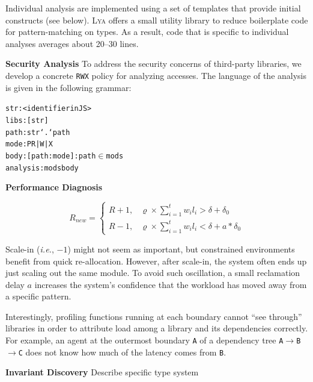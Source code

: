 \documentclass[letterpaper,twocolumn,10pt]{article}
\def\ie{{\em i.e.}, }
\newcommand{\heading}[1]{\vspace{2pt}\noindent\textbf{#1}\enspace}
\newcommand{\ttt}[1]{\texttt{#1}}
\newcommand{\sys}{{\scshape Lya}\xspace}
\begin{document}
Individual analysis are implemented using a set of templates that provide initial constructs (see below).
\sys offers a small utility library to reduce boilerplate code for pattern-matching on types.
As a result, code that is specific to individual analyses averages about 20--30 lines.

\heading{Security Analysis}
To address the security concerns of third-party libraries, we develop a concrete \ttt{RWX} policy for analyzing accesses.
The language of the analysis is given in the following grammar:

\begin{alltt}
  str:  <identifier in JS>
  libs: [ str ]
  path: str `.` path
  mode: P{ R | W | X }
  body: { [ path: mode ]: path \(\in\) mods}
  analysis:  mods body
\end{alltt}

\heading{Performance Diagnosis}

\begin{equation}
\label{eq:2}
R_{new} =
\begin{cases}
  R +1, & \varrho\times\sum_{i=1}^t{w_il_i} > \delta + \delta_0  \\
  R -1,  & \varrho\times\sum_{i=1}^t{w_il_i}  < \delta + a * \delta_0
\end{cases}
\end{equation}

Scale-in (\ie $-1$) might not seem as important, but constrained environments benefit from quick re-allocation.
However, after scale-in, the system often ends up just scaling out the same module.
To avoid such oscillation, a small reclamation delay $a$ increases the system's confidence that the workload has moved away from a specific pattern.

Interestingly, profiling functions running at each boundary cannot ``see through'' libraries in order to attribute load among a library and its dependencies correctly.
For example, an agent at the outermost boundary \ttt{A} of a dependency tree \ttt{A}$\rightarrow$\ttt{B}$\rightarrow$\ttt{C} does not know how much of the latency
comes from \ttt{B}. %


\heading{Invariant Discovery}
Describe specific type system

% 
\end{document}
